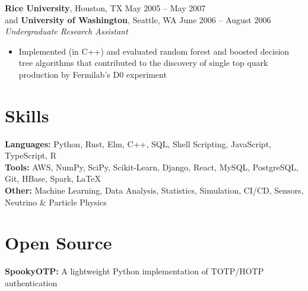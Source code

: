 \documentclass[margin,line]{resume}
\begin{document}
\begin{resume}
    \textbf{Rice University}, Houston, TX \hfill May 2005 -- May 2007 \vspace{1mm}\\\vspace{1mm}%
    and \textbf{University of Washington}, Seattle, WA \hfill June 2006 -- August 2006 \vspace{1mm}\\\vspace{1mm}%
    \textsl{Undergraduate Research Assistant}
    \begin{itemize}
    \item Implemented (in C++) and evaluated random forest and boosted decision tree algorithms that contributed to the discovery of single top quark production by Fermilab's D0 experiment
    \end{itemize}

    \section{\mysidestyle Skills}\vspace{0mm}%
    \textbf{Languages:} Python, Rust, Elm, C++, SQL, Shell Scripting, JavaScript, TypeScript, R
    \vspace{1mm}\\\vspace{0mm}%
    \textbf{Tools:} AWS, NumPy, SciPy, Scikit-Learn, Django, React, MySQL, PostgreSQL, Git, HBase, Spark, \LaTeX
    \vspace{1mm}\\\vspace{0mm}%
    \textbf{Other:} Machine Learning, Data Analysis, Statistics, Simulation, CI/CD, Sensors, Neutrino \& Particle Physics

    \section{\mysidestyle Open Source}\vspace{0mm}%
    \textbf{SpookyOTP:} A lightweight Python implementation of TOTP/HOTP authentication
    \vspace{1mm}%


\end{resume}
\end{document}
